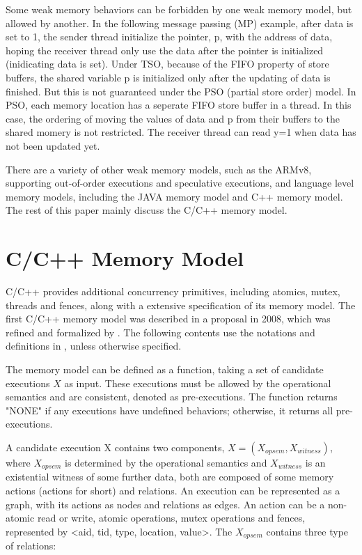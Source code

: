 Some weak memory behaviors can be forbidden by one weak memory model, but allowed by another. In the following message passing (MP) example, after data is set to 1, the sender thread initialize the pointer, p, with the address of data, hoping the receiver thread only use the data after the pointer is initialized (inidicating data is set). Under TSO, because of the FIFO property of store buffers, the shared variable p is initialized only after the updating of data is finished. But this is not guaranteed under the PSO (partial store order) model\cite{PSO}. In PSO, each memory location has a seperate FIFO store buffer in a thread. In this case, the ordering of moving the values of data and p from their buffers to the shared momery is not restricted. The receiver thread can read y=1 when data has not been updated yet. 

There are a variety of other weak memory models, such as the ARMv8, supporting out-of-order executions and speculative executions, and language level memory models, including the JAVA memory model\cite{java} and C++ memory model. The rest of this paper mainly discuss the C/C++ memory model\cite{c++model}. 






\section{C/C++ Memory Model}
C/C++ provides additional concurrency primitives, including atomics, mutex, threads and fences, along with a extensive specification of its memory model.
The first C/C++ memory model was described in a proposal\cite{c++model-proposal} in 2008, which was refined and formalized by \cite{c++model}. The following contents use the notations and definitions in \cite{c++model}, unless otherwise specified. 

The memory model can be defined as a function, taking a set of candidate executions $X$ as input. These executions must be allowed by the operational semantics and are consistent, denoted as pre-executions. The function returns "NONE" if any executions have undefined behaviors; otherwise, it returns all pre-executions.

A candidate execution X contains two components, $X = (X_{opsem}, X_{witness})$, where $X_{opsem}$ is determined by the operational semantics and $X_{witness}$ is an existential witness of some further data, both are composed of some memory actions (actions for short) and relations. An execution can be represented as a graph, with its actions as nodes and relations as edges. An action can be a non-atomic read or write, atomic operations, mutex operations and fences, represented by <aid, tid, type, location, value>. The $X_{opsem}$ contains three type of relations: 

